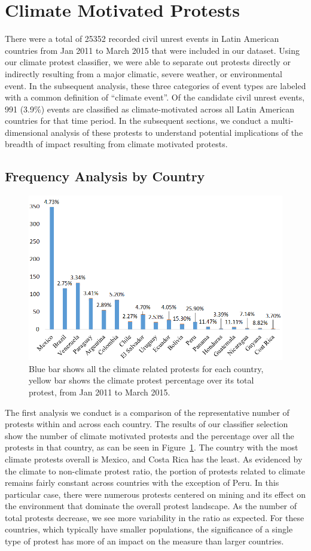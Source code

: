 \documentclass[9pt,twocolumn,twoside]{pnas-new}
\begin{document}
\section{Climate Motivated Protests}
There were a total of 25352 recorded civil unrest events in Latin American countries from Jan 2011 to March 2015 that were included in our dataset.
Using our climate protest classifier, we were able to separate out protests directly or indirectly resulting from a major climatic, severe weather, or environmental event.
In the subsequent analysis, these three categories of event types are labeled with a common definition of ``climate event''.
Of the candidate civil unrest events, 991 (3.9\%) events are classified as climate-motivated across all Latin American countries for that time period.
In the subsequent sections, we conduct a multi-dimensional analysis of these protests to understand potential implications of the breadth of impact resulting from climate motivated protests.

\subsection{Frequency Analysis by Country}

\begin{figure}[htb]
\centerline
{\includegraphics[width=.48\textwidth]{figures/month-country-protest4}}
\caption{Blue bar shows all the climate related protests for each country, yellow bar shows the climate protest percentage over its total protest, from Jan 2011 to March 2015.}
\label{month_percentage}
\end{figure}

The first analysis we conduct is a comparison of the representative number of protests within and across each country.
The results of our classifier selection show the number of climate motivated protests and the percentage over all the protests in that country, as can be seen in Figure~\ref{month_percentage}.
The country with the most climate protests overall is Mexico, and Costa Rica has the least.
As evidenced by the climate to non-climate protest ratio, the portion of protests related to climate remains fairly constant across countries with the exception of Peru.
In this particular case, there were numerous protests centered on mining and its effect on the environment that dominate the overall protest landscape.
As the number of total protests decrease, we see more variability in the ratio as expected.
For these countries, which typically have smaller populations, the significance of a single type of protest has more of an impact on the measure than larger countries.
\end{document}
